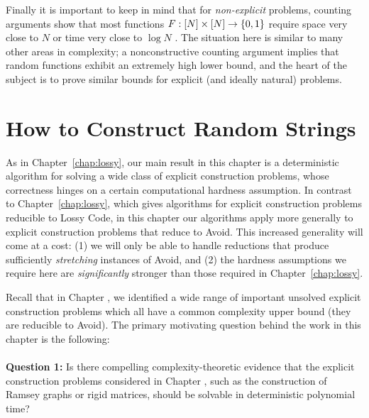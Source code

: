 Finally it is important to keep in mind that for \emph{non-explicit} problems, counting arguments show that most functions $F: [N] \times [N] \to \{0,1\}$ require space very close to $N$ or time very close to $\log N$ \cite{miltersen-bit-probe}. The situation here is similar to many other areas in complexity; a nonconstructive counting argument implies that random functions exhibit an extremely high lower bound, and the heart of the subject is to prove similar bounds for explicit (and ideally natural) problems.


\section{How to Construct Random Strings}
As in Chapter~\ref{chap:lossy}, our main result in this chapter is a deterministic algorithm for solving a wide class of explicit construction problems, whose correctness hinges on a certain computational hardness assumption. In contrast to Chapter~\ref{chap:lossy}, which gives algorithms for explicit construction problems reducible to Lossy Code, in this chapter our algorithms apply more generally to explicit construction problems that reduce to Avoid. This increased generality will come at a cost: (1) we will only be able to handle reductions that produce sufficiently \emph{stretching} instances of Avoid, and (2) the hardness assumptions we require here are \emph{significantly} stronger than those required in Chapter~\ref{chap:lossy}. 

Recall that in Chapter , we identified a wide range of important unsolved explicit construction problems which all have a common complexity upper bound (they are reducible to Avoid). The primary motivating question behind the work in this chapter is the following:\\
\\
{\bf \noindent Question 1:} Is there compelling complexity-theoretic evidence that the explicit construction problems considered in Chapter , such as the construction of Ramsey graphs or rigid matrices, should be solvable in deterministic polynomial time? \\

